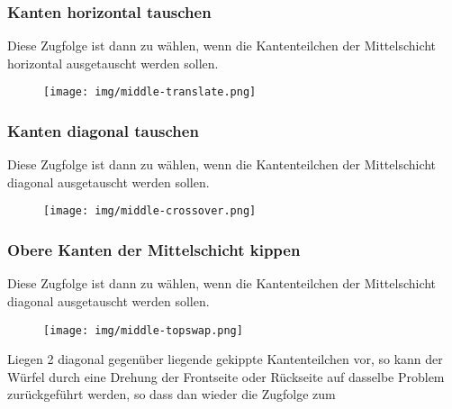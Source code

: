 \documentclass[letterpaper,10pt,twoside,twocolumn,openany]{book}
\begin{document}
\subsubsection{Kanten horizontal tauschen}
\begin{justify}
Diese Zugfolge ist dann zu wählen, wenn die Kantenteilchen der Mittelschicht horizontal ausgetauscht werden sollen.  
\end{justify}
\begin{figure}[!htb] 
  \centering
     \texttt{[image: img/middle-translate.png]}
\end{figure}

\subsubsection{Kanten diagonal tauschen}
\begin{justify}
Diese Zugfolge ist dann zu wählen, wenn die Kantenteilchen der Mittelschicht diagonal ausgetauscht werden sollen.
\end{justify}
\begin{figure}[!htb] 
  \centering
     \texttt{[image: img/middle-crossover.png]}
\end{figure}

\subsubsection{Obere Kanten der Mittelschicht kippen}
\begin{justify}
Diese Zugfolge ist dann zu wählen, wenn die Kantenteilchen der Mittelschicht diagonal ausgetauscht werden sollen.
\end{justify}
\begin{figure}[!htb] 
  \centering
     \texttt{[image: img/middle-topswap.png]}
\end{figure}

\begin{justify}
Liegen 2 diagonal gegenüber liegende gekippte Kantenteilchen vor, so kann der Würfel durch eine Drehung der Frontseite oder Rückseite auf dasselbe Problem zurückgeführt werden, so dass dan wieder die Zugfolge zum 
\end{justify}
\end{document}
